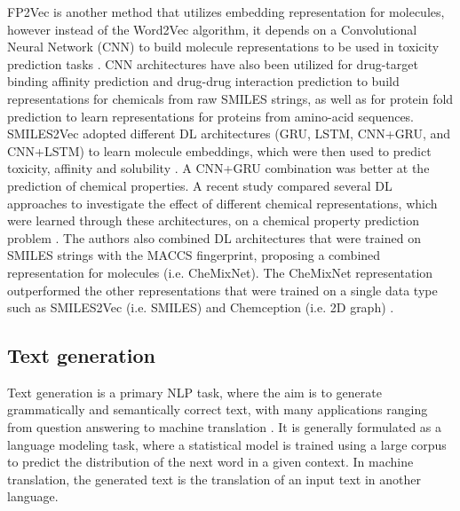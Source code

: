 \documentclass[review]{elsarticle}
\begin{document}

FP2Vec is another method that utilizes embedding representation for molecules, however instead of the Word2Vec algorithm, it depends on a Convolutional Neural Network (CNN) to build molecule representations to be used in toxicity prediction tasks \cite{jeon2019fp2vec}.  CNN architectures have also been utilized for drug-target binding affinity prediction \cite{ozturk2018deepdta} and drug-drug interaction prediction \cite{kwon2017deepcci} to build representations for chemicals from raw SMILES strings, as well as for protein fold prediction \cite{hou2017deepsf} to learn  representations for proteins from amino-acid sequences.  SMILES2Vec adopted different DL architectures (GRU, LSTM, CNN+GRU, and CNN+LSTM) to learn molecule embeddings, which were then used to predict toxicity, affinity and solubility \cite{goh2017smiles2vec}. A CNN+GRU combination was better at the prediction of chemical properties. A recent study compared several DL approaches to investigate the effect of different chemical representations, which were learned through these architectures, on a chemical property prediction problem \cite{paul2018chemixnet}. The authors also combined DL architectures that were trained on SMILES strings with the MACCS fingerprint, proposing a combined representation for molecules (i.e. CheMixNet). The CheMixNet representation outperformed the other representations that were trained on a single data type such as SMILES2Vec (i.e. SMILES) and Chemception (i.e. 2D graph) \cite{goh2017chemception}.  


\subsection{Text generation} \label{section:textgeneration}

Text generation is a primary NLP task, where the aim is to generate grammatically and semantically correct text, with many applications ranging from question answering to machine translation \cite{wang2019topic}. It is generally formulated as a language modeling task, where a statistical model is trained using a large corpus to predict the distribution of the next word in a given context. In machine translation, the generated text is the translation of an input text in another language. 
\end{document}
